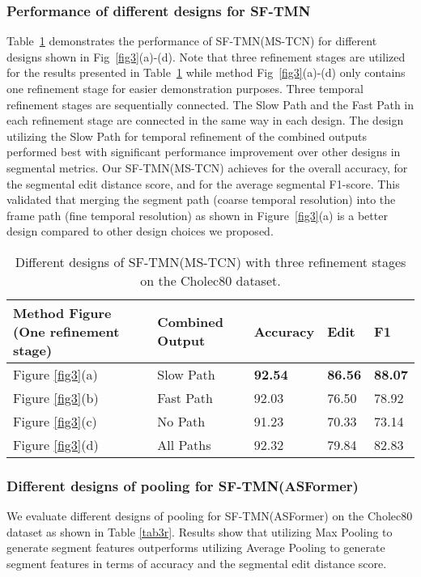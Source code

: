 \documentclass[sn-mathphys,Numbered]{sn-jnl}
\theoremstyle{thmstyleone}\newtheorem{theorem}{Theorem}\newtheorem{proposition}[theorem]{Proposition}
\theoremstyle{thmstyletwo}\newtheorem{example}{Example}\newtheorem{remark}{Remark}
\theoremstyle{thmstylethree}\newtheorem{definition}{Definition}
\begin{document}
\subsubsection{Performance of different designs for SF-TMN}
Table~\ref{tab4} demonstrates the performance of SF-TMN(MS-TCN) for different designs shown in Fig~\ref{fig3}(a)-(d). Note that three refinement stages are utilized for the results presented in Table~\ref{tab4} while method Fig~\ref{fig3}(a)-(d) only contains one refinement stage for easier demonstration purposes. Three temporal refinement stages are sequentially connected. The Slow Path and the Fast Path in each refinement stage are connected in the same way in each design. The design utilizing the Slow Path for temporal refinement of the combined outputs performed best with significant performance improvement over other designs in segmental metrics. Our SF-TMN(MS-TCN) achieves  for the overall accuracy,  for the segmental edit distance score, and  for the average segmental F1-score. This validated that merging the segment path (coarse temporal resolution) into the frame path (fine temporal resolution) as shown in Figure~\ref{fig3}(a) is a better design compared to other design choices we proposed.

\begin{table}[h]
\centering
\caption{Different designs of SF-TMN(MS-TCN) with three refinement stages on the Cholec80 dataset.}\label{tab4}
\begin{tabular}{lllll}
\hline
Method Figure (One refinement stage) &  Combined Output & Accuracy & Edit & F1\\
\hline
Figure \ref{fig3}(a) & Slow Path & \textbf{92.54} & \textbf{86.56} & \textbf{88.07} \\
Figure \ref{fig3}(b) & Fast Path & 92.03 & 76.50 &  78.92 \\
Figure \ref{fig3}(c) & No Path & 91.23 &  70.33 & 73.14 \\
Figure \ref{fig3}(d) & All Paths & 92.32 & 79.84 & 82.83 \\

\hline
\end{tabular}
\end{table}


\subsubsection{Different designs of pooling for SF-TMN(ASFormer)}
We evaluate different designs of pooling for SF-TMN(ASFormer) on the Cholec80 dataset as shown in Table \ref{tab3r}. Results show that utilizing Max Pooling to generate segment features outperforms utilizing Average Pooling to generate segment features in terms of accuracy and the segmental edit distance score. 
\end{document}
